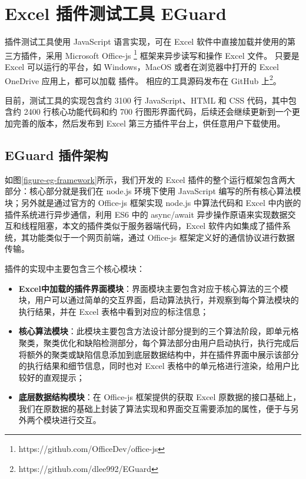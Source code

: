 \section{Excel 插件测试工具 EGuard}
\eg 插件测试工具使用 JavaScript 语言实现，可在 Excel 软件中直接加载并使用的第三方插件，采用 Microsoft Office-js \footnote{https://github.com/OfficeDev/office-js} 框架来异步读写和操作 Excel 文件。
只要是 Excel 可以运行的平台，如 Windows，MacOS 或者在浏览器中打开的 Excel OneDrive 应用上，都可以加载 \eg 插件。
相应的工具源码发布在 GitHub 上\footnote{https://github.com/dlee992/EGuard}。

目前，\eg 测试工具的实现包含约 3100 行 JavaScript、HTML 和 CSS 代码，其中包含约 2400 行核心功能代码和约 700 行图形界面代码，后续还会继续更新到一个更加完善的版本，然后发布到 Excel 第三方插件平台上，供任意用户下载使用。

\subsection{EGuard 插件架构}

如图\ref{figure-eg-framework}所示，我们开发的 Excel 插件\eg 的整个运行框架包含两大部分：核心部分就是我们在 node.js 环境下使用 JavaScript 编写的所有核心算法模块；另外就是通过官方的 Office-js 框架实现 node.js 中算法代码和 Excel 中内嵌的插件系统进行异步通信，利用 ES6 中的 async/await 异步操作原语来实现数据交互和线程阻塞，本文的插件\eg 类似于服务器端代码，Excel 软件内如集成了插件系统，其功能类似于一个网页前端，通过 Office-js 框架定义好的通信协议进行数据传输。

插件\eg 的实现中主要包含三个核心模块：
\begin{itemize}
    \item \textbf{Excel中加载的插件界面模块}：界面模块主要包含对应于核心算法的三个模块，用户可以通过简单的交互界面，启动算法执行，并观察到每个算法模块的执行结果，并在 Excel 表格中看到对应的标注信息；
    \item \textbf{核心算法模块}：此模块主要包含方法设计部分提到的三个算法阶段，即单元格聚类，聚类优化和缺陷检测部分，每个算法部分由用户启动执行，执行完成后将额外的聚类或缺陷信息添加到底层数据结构中，并在插件界面中展示该部分的执行结果和细节信息，同时也对 Excel 表格中的单元格进行渲染，给用户比较好的直观提示；
    \item \textbf{底层数据结构模块}：在 Office-js 框架提供的获取 Excel 原数据的接口基础上，我们在原数据的基础上封装了算法实现和界面交互需要添加的属性，便于与另外两个模块进行交互。
\end{itemize}

